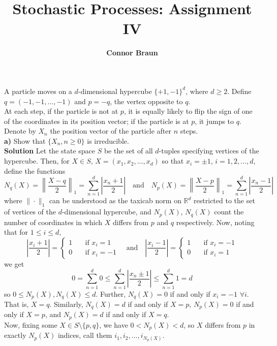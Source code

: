 \documentclass[11pt, letterpaper]{article}
\title{\bf Stochastic Processes: Assignment IV}
\author{\bf Connor Braun}
\date{}
\newcommand{\mbb}[1]{\mathbb{#1}}
\begin{document}
    
    \maketitle
     A particle moves on a $d$-dimensional hypercube $\{+1,-1\}^d$, where $d\geq 2$. Define $q=(-1,-1,\dots,-1)$ and $p=-q$, the vertex opposite to $q$.\\[10pt]
    At each step, if the particle is not at $p$, it is equally likely to flip the sign of one of the coordinates in its position vector; if the particle is at $p$,
    it jumps to $q$. Denote by $X_n$ the position vector of the particle after $n$ steps.\\[10pt]
    {\bf a)} Show that $\{X_n,n\geq 0\}$ is irreducible.\\[10pt]
    {\bf Solution} Let the state space $S$ be the set of all $d$-tuples specifying vertices of the hypercube. Then, for $X\in S$, $X=(x_1,x_2,\dots,x_d)$ so that $x_i=\pm 1$, $i=1,2,\dots,d$, define the functions
    \[N_q(X)=\left\|\frac{X-q}{2}\right\|_1=\sum_{n=1}^d\left|\frac{x_n+1}{2}\right|\quad\text{and}\quad N_p(X)=\left\|\frac{X-p}{2}\right\|_1=\sum_{n=1}^d\left|\frac{x_n-1}{2}\right|\]
    where $\|\cdot\|_1$ can be understood as the taxicab norm on $\mbb{R}^d$ restricted to the set of vertices of the $d$-dimensional hypercube, and $N_p(X)$, $N_q(X)$ count the number of coordinates in which $X$ differs from $p$ and $q$ respectively.
    Now, noting that for $1\leq i\leq d$,
    \[\left|\frac{x_i+1}{2}\right|=\begin{cases}
        1\quad&\text{if $x_i=1$}\\
        0\quad&\text{if $x_i=-1$}
    \end{cases}\quad\text{and}\quad \left|\frac{x_i-1}{2}\right|=\begin{cases}
        1\quad&\text{if $x_i=-1$}\\
        0\quad&\text{if $x_i=1$}
    \end{cases}\]
    we get
    \[0=\sum_{n=1}^d0\leq\sum_{n=1}^d\left|\frac{x_n\pm1}{2}\right|\leq\sum_{n=1}^d1=d\]
    so $0\leq N_p(X),N_q(X)\leq d$. Further, $N_q(X)=0$ if and only if $x_i=-1$ $\forall i$. That is, $X=q$. Similarly,
    $N_q(X)=d$ if and only if $X=p$, $N_p(X)=0$ if and only if $X=p$, and $N_p(X)=d$ if and only if $X=q$.\\[10pt]
    Now, fixing some $X\in S\setminus\{p,q\}$, we have $0<N_p(X)<d$, so $X$ differs from $p$ in exactly $N_p(X)$ indices, call them $i_1,i_2,\dots,i_{N_p(X)}$.\\[10pt]
\end{document}

